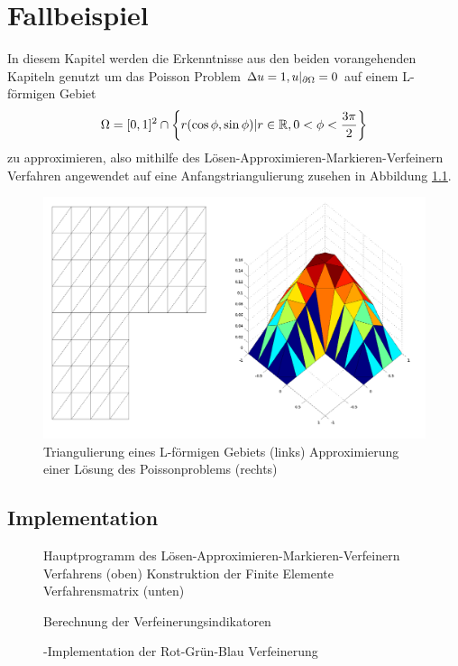 \chapter{Fallbeispiel}
In diesem Kapitel werden die Erkenntnisse aus den beiden vorangehenden Kapiteln genutzt um das Poisson Problem $\Delta u = 1, u|_{\partial \Omega} = 0$ auf einem L-förmigen Gebiet   
\[
\Omega = [0,1]^2 \cap \left\{ r(\cos\phi,\sin\phi)| r\in\mathbb{R},0<\phi<\frac{3 \pi}{2} \right\}
\] 
zu approximieren, also mithilfe des Lösen-Approximieren-Markieren-Verfeinern Verfahren angewendet auf eine Anfangstriangulierung zusehen in Abbildung \ref{grid}.
\begin{figure}[!htbp]
	\begin{center}
		\includegraphics[width=15cm]{pics/nonref.png}
	\end{center}
	\caption{\label{grid}Triangulierung eines L-förmigen Gebiets (links) Approximierung einer Lösung des Poissonproblems (rechts)}
\end{figure}
\section{Implementation}
\begin{figure}
	
	\caption{ Hauptprogramm des Lösen-Approximieren-Markieren-Verfeinern Verfahrens (oben) Konstruktion der Finite Elemente Verfahrensmatrix (unten)}
\end{figure}

\begin{figure}
	
	\caption{Berechnung der Verfeinerungsindikatoren}
\end{figure}

\begin{figure}
	
	\caption{ \matlab-Implementation der Rot-Grün-Blau Verfeinerung}
\end{figure}

